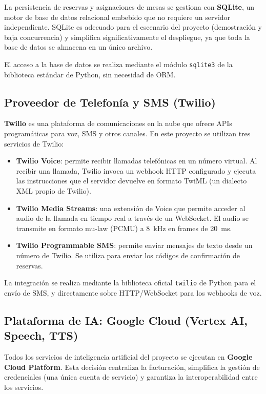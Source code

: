La persistencia de reservas y asignaciones de mesas se gestiona con \textbf{SQLite}, un motor de base de datos relacional embebido que no requiere un servidor independiente. SQLite es adecuado para el escenario del proyecto (demostración y baja concurrencia) y simplifica significativamente el despliegue, ya que toda la base de datos se almacena en un único archivo.

El acceso a la base de datos se realiza mediante el módulo \texttt{sqlite3} de la biblioteca estándar de Python, sin necesidad de ORM.

\subsection{Proveedor de Telefonía y SMS (Twilio)}
\label{subsec:twilio_stack}

\textbf{Twilio} es una plataforma de comunicaciones en la nube que ofrece APIs programáticas para voz, SMS y otros canales. En este proyecto se utilizan tres servicios de Twilio:

\begin{itemize}
    \item \textbf{Twilio Voice}: permite recibir llamadas telefónicas en un número virtual. Al recibir una llamada, Twilio invoca un webhook HTTP configurado y ejecuta las instrucciones que el servidor devuelve en formato TwiML (un dialecto XML propio de Twilio).
    \item \textbf{Twilio Media Streams}: una extensión de Voice que permite acceder al audio de la llamada en tiempo real a través de un WebSocket. El audio se transmite en formato mu-law (PCMU) a 8~kHz en frames de 20~ms.
    \item \textbf{Twilio Programmable SMS}: permite enviar mensajes de texto desde un número de Twilio. Se utiliza para enviar los códigos de confirmación de reservas.
\end{itemize}

La integración se realiza mediante la biblioteca oficial \texttt{twilio} de Python para el envío de SMS, y directamente sobre HTTP/WebSocket para los webhooks de voz.

\subsection{Plataforma de IA: Google Cloud (Vertex AI, Speech, TTS)}
\label{subsec:google_cloud_stack}

Todos los servicios de inteligencia artificial del proyecto se ejecutan en \textbf{Google Cloud Platform}. Esta decisión centraliza la facturación, simplifica la gestión de credenciales (una única cuenta de servicio) y garantiza la interoperabilidad entre los servicios.

